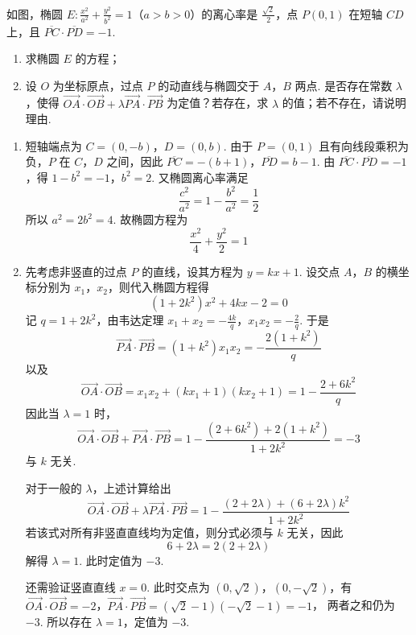\begin{problem}
如图，椭圆 \(E: \frac{x^2}{a^2} + \frac{y^2}{b^2} = 1\)（\(a > b > 0\)）的离心率是 \(\frac{\sqrt{2}}{2}\)，点 \(P(0,1)\) 在短轴 \(CD\) 上，且 \(\overline{PC} \cdot \overline{PD} = -1\).

\begin{enumerate}
\item 求椭圆 \(E\) 的方程；
\item 设 \(O\) 为坐标原点，过点 \(P\) 的动直线与椭圆交于 \(A\)，\(B\) 两点. 是否存在常数 \(\lambda\)，使得 \(\overrightarrow{OA} \cdot \overrightarrow{OB} + \lambda \overrightarrow{PA} \cdot \overrightarrow{PB}\) 为定值？若存在，求 \(\lambda\) 的值；若不存在，请说明理由.
\end{enumerate}

\end{problem}

\begin{solution}
\begin{enumerate}
\item
短轴端点为 \(C=(0,-b)\)，\(D=(0,b)\). 由于 \(P=(0,1)\) 且有向线段乘积为负，\(P\) 在 \(C\)，\(D\) 之间，因此
\(\overline{PC}=-(b+1)\)，\(\overline{PD}=b-1\).
由 \(\overline{PC}\cdot\overline{PD}=-1\)，得
\(1-b^2=-1\)，\(b^2=2\).
又椭圆离心率满足
\[
\frac{c^2}{a^2}=1-\frac{b^2}{a^2}=\frac12
\]
所以 \(a^2=2b^2=4\). 故椭圆方程为
\[
\frac{x^2}{4}+\frac{y^2}{2}=1
\]

\item 先考虑非竖直的过点 \(P\) 的直线，设其方程为 \(y=kx+1\). 设交点 \(A\)，\(B\) 的横坐标分别为 \(x_1\)，\(x_2\)，则代入椭圆方程得
\[
(1+2k^2)x^2+4kx-2=0
\]
记 \(q=1+2k^2\)，由韦达定理
\(x_1+x_2=-\frac{4k}{q}\)，\(x_1x_2=-\frac2q\).
于是
\[
\overrightarrow{PA}\cdot\overrightarrow{PB}
=(1+k^2)x_1x_2=-\frac{2(1+k^2)}q
\]
以及
\[
\overrightarrow{OA}\cdot\overrightarrow{OB}
=x_1x_2+(kx_1+1)(kx_2+1)
=1-\frac{2+6k^2}{q}
\]
因此当 \(\lambda=1\) 时，
\[
\overrightarrow{OA}\cdot\overrightarrow{OB}
+\overrightarrow{PA}\cdot\overrightarrow{PB}
=1-\frac{(2+6k^2)+2(1+k^2)}{1+2k^2}=-3
\]
与 \(k\) 无关.

对于一般的 \(\lambda\)，上述计算给出
\[
\overrightarrow{OA}\cdot\overrightarrow{OB}
+\lambda\overrightarrow{PA}\cdot\overrightarrow{PB}
=1-\frac{(2+2\lambda)+(6+2\lambda)k^2}{1+2k^2}
\]
若该式对所有非竖直直线均为定值，则分式必须与 \(k\) 无关，因此
\[
6+2\lambda=2(2+2\lambda)
\]
解得 \(\lambda=1\). 此时定值为 \(-3\).

还需验证竖直直线 \(x=0\). 此时交点为 \((0,\sqrt2)\)，\((0,-\sqrt2)\)，有
\(\overrightarrow{OA}\cdot\overrightarrow{OB}=-2\)，\(\overrightarrow{PA}\cdot\overrightarrow{PB}=(\sqrt2-1)(-\sqrt2-1)=-1\)，
两者之和仍为 \(-3\). 所以存在 \(\lambda=1\)，定值为 \(-3\).
\end{enumerate}
\end{solution}

